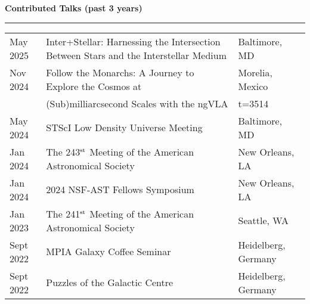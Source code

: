 \documentclass[11pt]{article}
\makeatletter
\def\vhrulefill#1{\leavevmode\leaders\hrule \@height #1\hfill \kern\z@}
\newcommand{\subsectionname}[1]{{\large\bf #1 \vhrulefill{0.5pt}}}
\makeatother
\begin{document}

\subsectionname{Contributed Talks {\small (past 3 years)}}\vspace{-6pt}


\begin{longtable}{p{} p{}p{}}

May 2025 & Inter+Stellar: Harnessing the Intersection Between Stars and the Interstellar Medium & {\small Baltimore, MD}\\

Nov 2024 & Follow the Monarchs: A Journey to Explore the Cosmos at  & {\small Morelia, Mexico}\\
& (Sub)milliarcsecond Scales with the ngVLA {\small(\href{https://youtu.be/CHdCz9VyqIM?si=kyrCyJ9LXm9UtWOj&t=3514}{Recorded})} & \\

May 2024 & STScI Low Density Universe Meeting & {\small Baltimore, MD}\\

Jan 2024 & The 243$^{\rm st}$ Meeting of the American Astronomical Society & {\small New Orleans, LA}\\

Jan 2024 & 2024 NSF-AST Fellows Symposium & {\small New Orleans, LA}\\

Jan 2023 & The 241$^{\rm st}$ Meeting of the American Astronomical Society & {\small Seattle, WA}\\


Sept 2022 & MPIA Galaxy Coffee Seminar & {\small Heidelberg, Germany}\\

Sept 2022 & Puzzles of the Galactic Centre & {\small Heidelberg, Germany}\\





\end{longtable}
\end{document}
